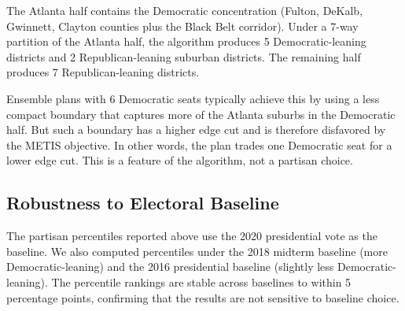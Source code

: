 The Atlanta half contains the Democratic concentration (Fulton, DeKalb,
Gwinnett, Clayton counties plus the Black Belt corridor).  Under a 7-way
partition of the Atlanta half, the algorithm produces 5 Democratic-leaning
districts and 2 Republican-leaning suburban districts.  The remaining half
produces 7 Republican-leaning districts.

Ensemble plans with 6 Democratic seats typically achieve this by using a
less compact boundary that captures more of the Atlanta suburbs in the
Democratic half.  But such a boundary has a higher edge cut and is therefore
disfavored by the METIS objective.  In other words, the \ar{} plan trades
one Democratic seat for a lower edge cut.  This is a feature of the algorithm,
not a partisan choice.

\subsection{Robustness to Electoral Baseline}

The partisan percentiles reported above use the 2020 presidential vote as the
baseline.  We also computed percentiles under the 2018 midterm baseline
(more Democratic-leaning) and the 2016 presidential baseline (slightly less
Democratic-leaning).  The \ar{} percentile rankings are stable across
baselines to within 5 percentage points, confirming that the results are not
sensitive to baseline choice.
